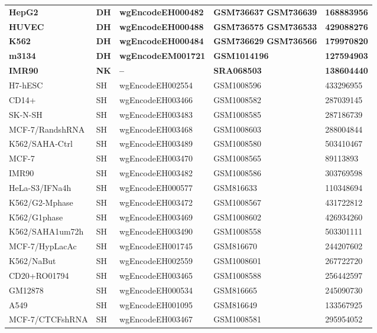 \begin{longtable}{p{3.5cm}p{1.2cm}p{3.7cm}p{2.5cm}p{2.8cm}}
\textbf{HepG2} & \textbf{DH} & \textbf{wgEncodeEH000482} & \textbf{GSM736637} \newline \textbf{GSM736639} & \textbf{168883956} \\
\textbf{HUVEC} & \textbf{DH} & \textbf{wgEncodeEH000488} & \textbf{GSM736575} \newline \textbf{GSM736533} & \textbf{429088276} \\
\textbf{K562} & \textbf{DH} & \textbf{wgEncodeEH000484} & \textbf{GSM736629} \newline \textbf{GSM736566} & \textbf{179970820} \\
\textbf{m3134} & \textbf{DH} & \textbf{wgEncodeEM001721} & \textbf{GSM1014196} & \textbf{127594903} \\
\textbf{IMR90} & \textbf{NK} & \textbf{--}    & \textbf{SRA068503} & \textbf{138604440} \\
H7-hESC & SH & wgEncodeEH002554 & GSM1008596 & 433296955 \\
CD14+ & SH & wgEncodeEH003466 & GSM1008582 & 287039145 \\
SK-N-SH & SH & wgEncodeEH003483 & GSM1008585 & 287186739 \\
MCF-7/RandshRNA & SH & wgEncodeEH003468 & GSM1008603 & 288004844 \\
K562/SAHA-Ctrl & SH & wgEncodeEH003489 & GSM1008580 & 503410467 \\
MCF-7 & SH & wgEncodeEH003470 & GSM1008565 & 89113893 \\
IMR90 & SH & wgEncodeEH003482 & GSM1008586 & 303769598 \\
HeLa-S3/IFNa4h & SH & wgEncodeEH000577 & GSM816633 & 110348694 \\
K562/G2-Mphase & SH & wgEncodeEH003472 & GSM1008567 & 431722812 \\
K562/G1phase & SH & wgEncodeEH003469 & GSM1008602 & 426934260 \\
K562/SAHA1um72h & SH & wgEncodeEH003490 & GSM1008558 & 503301111 \\
MCF-7/HypLacAc & SH & wgEncodeEH001745 & GSM816670 & 244207602 \\
K562/NaBut & SH & wgEncodeEH002559 & GSM1008601 & 267722720 \\
CD20+RO01794 & SH & wgEncodeEH003465 & GSM1008588 & 256442597 \\
GM12878 & SH & wgEncodeEH000534 & GSM816665 & 245090730 \\
A549 & SH & wgEncodeEH001095 & GSM816649 & 133567925 \\
MCF-7/CTCFshRNA & SH & wgEncodeEH003467 & GSM1008581 & 295954052 \\

\end{longtable}

